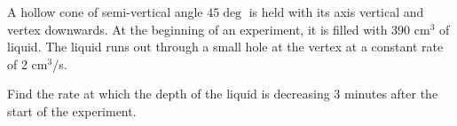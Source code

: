 \begin{problem}
    \begin{center}
    \end{center}

    A hollow cone of semi-vertical angle $45\deg$ is held with its axis vertical and vertex downwards. At the beginning of an experiment, it is filled with 390 cm$^3$ of liquid. The liquid runs out through a small hole at the vertex at a constant rate of 2 cm$^3$/s. 

    Find the rate at which the depth of the liquid is decreasing 3 minutes after the start of the experiment.
\end{problem}
